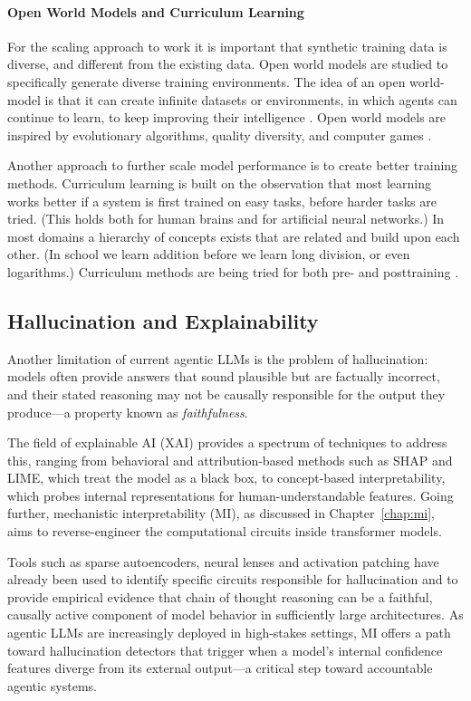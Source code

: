 \paragraph{Open World Models and Curriculum Learning}
For the scaling approach to work it is important that synthetic training data is diverse, and different from the existing data. Open world models are studied to specifically generate diverse training environments. The idea of an open world-model is that it can create infinite datasets or environments, in which agents can continue to learn, to keep improving their intelligence \citep{bruce2024genie}. Open world models are inspired by evolutionary algorithms, quality diversity, and computer games \citep{vinyals2019grandmaster,mouret2015illuminating,meta2022human}.

Another approach to further scale model performance is to create better training methods. Curriculum learning is built on the observation that most learning works better if a system is first trained on easy tasks, before harder tasks are tried. (This holds both for human brains and for artificial neural networks.) In most domains a hierarchy of concepts exists that are related and build upon each other. (In school we learn addition before we learn long division, or even logarithms.) Curriculum methods are being tried for both pre- and posttraining \citep{chen2025self,elgaar2026curriculum}.

\subsection{Hallucination and Explainability}
Another  limitation of current agentic LLMs is the problem of hallucination: models often provide answers that sound plausible but are factually incorrect, and their stated reasoning may not be causally responsible for the output they produce---a property known as \emph{faithfulness}. 

The field of explainable AI (XAI) provides a spectrum of techniques to address this, ranging from behavioral and attribution-based methods such as SHAP and LIME, which treat the model as a black box, to concept-based interpretability, which probes internal representations for human-understandable features. Going further, mechanistic interpretability (MI), as discussed in Chapter~\ref{chap:mi}, aims to reverse-engineer the computational circuits inside transformer models. 

Tools such as sparse autoencoders, neural lenses and activation patching have already been used to identify specific circuits responsible for hallucination and to provide empirical evidence that chain of thought reasoning can be a faithful, causally active component of model behavior in sufficiently large architectures. As agentic LLMs are increasingly deployed in high-stakes settings, MI offers a path toward hallucination detectors that trigger when a model's internal confidence features diverge from its external output---a critical step toward accountable agentic systems.

